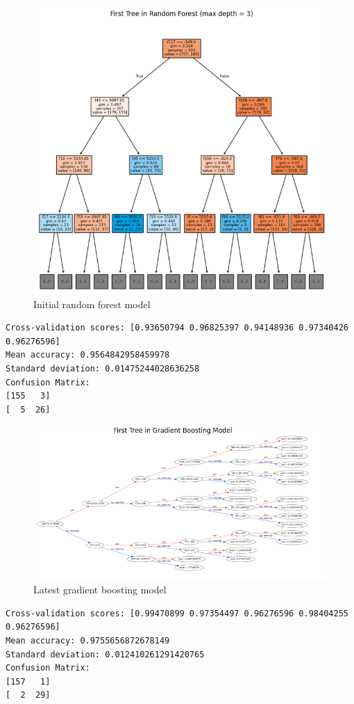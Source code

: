\documentclass[conference]{IEEEtran}
\begin{document}
\begin{figure}[H]
    \centerline{\includegraphics[width=0.6\linewidth]{random_forest.png}}
    \caption{Initial random forest model}
\end{figure}

\begin{lstlisting}[caption={Initial random forest model performance}]
Cross-validation scores: [0.93650794 0.96825397 0.94148936 0.97340426 0.96276596]
Mean accuracy: 0.9564842958459978
Standard deviation: 0.01475244028636258
Confusion Matrix:
[155   3]
[  5  26]
\end{lstlisting}

\begin{figure}[H]
    \centerline{\includegraphics[width=\linewidth]{gradient_boosting.png}}
    \caption{Latest gradient boosting model}
\end{figure}

\begin{lstlisting}[caption={Gradient boosting model performance}]
Cross-validation scores: [0.99470899 0.97354497 0.96276596 0.98404255 0.96276596]
Mean accuracy: 0.9755656872678149
Standard deviation: 0.012410261291420765
Confusion Matrix:
[157   1]
[  2  29]
\end{lstlisting}
\end{document}
